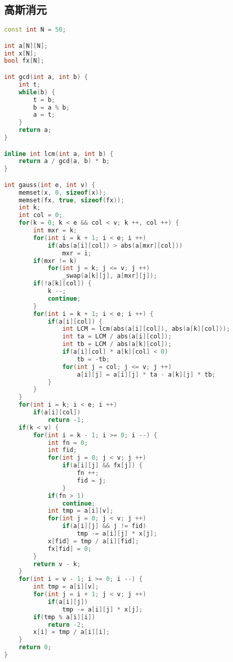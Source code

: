 \subsection{高斯消元}
    \begin{lstlisting}[language=c++]
const int N = 50;

int a[N][N];
int x[N];
bool fx[N];

int gcd(int a, int b) {
    int t;
    while(b) {
        t = b;
        b = a % b;
        a = t;
    }
    return a;
}

inline int lcm(int a, int b) {
    return a / gcd(a, b) * b;
}

int gauss(int e, int v) {
    memset(x, 0, sizeof(x));
    memset(fx, true, sizeof(fx));
    int k;
    int col = 0;
    for(k = 0; k < e && col < v; k ++, col ++) {
        int mxr = k;
        for(int i = k + 1; i < e; i ++)
            if(abs(a[i][col]) > abs(a[mxr][col]))
                mxr = i;
        if(mxr != k)
            for(int j = k; j <= v; j ++)
                _swap(a[k][j], a[mxr][j]);
        if(!a[k][col]) {
            k --;
            continue;
        }
        for(int i = k + 1; i < e; i ++) {
            if(a[i][col]) {
                int LCM = lcm(abs(a[i][col]), abs(a[k][col]));
                int ta = LCM / abs(a[i][col]);
                int tb = LCM / abs(a[k][col]);
                if(a[i][col] * a[k][col] < 0)
                    tb = -tb;
                for(int j = col; j <= v; j ++) 
                    a[i][j] = a[i][j] * ta - a[k][j] * tb;
            }
        }
    }
    for(int i = k; i < e; i ++)
        if(a[i][col]) 
            return -1;
    if(k < v) {
        for(int i = k - 1; i >= 0; i --) {
            int fn = 0;
            int fid;
            for(int j = 0; j < v; j ++)
                if(a[i][j] && fx[j]) {
                    fn ++;
                    fid = j;
                }
            if(fn > 1) 
                continue;
            int tmp = a[i][v];
            for(int j = 0; j < v; j ++)
                if(a[i][j] && j != fid)
                    tmp -= a[i][j] * x[j];
            x[fid] = tmp / a[i][fid];
            fx[fid] = 0;
        }
        return v - k;
    }
    for(int i = v - 1; i >= 0; i --) {
        int tmp = a[i][v];
        for(int j = i + 1; j < v; j ++)
            if(a[i][j]) 
                tmp -= a[i][j] * x[j];
        if(tmp % a[i][i])
            return -2;
        x[i] = tmp / a[i][i];
    }
    return 0;
}
    \end{lstlisting}
